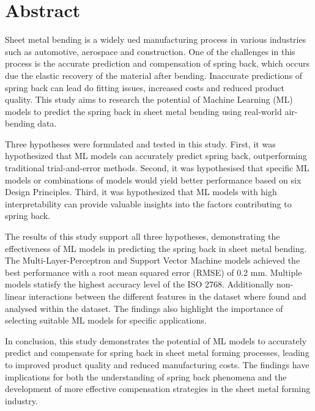 
\section*{Abstract}
\noindent Sheet metal bending is a widely ued manufacturing process in various industries such as automotive,
aerospace and construction.
One of the challenges in this process is the accurate prediction and compensation of spring back, which occurs
due the elastic recovery of the material after bending.
Inaccurate predictions of spring back can lead do fitting issues, increased costs and reduced product quality.
This study aims to research the potential of Machine Learning (ML) models to predict the spring back in sheet
metal bending using real-world air-bending data.

Three hypotheses were formulated and tested in this study.
First, it was hypothesized that ML models can accurately predict spring back, outperforming traditional trial-and-error methods.
Second, it was hypothesised that specific ML models or combinations of models would yield better performance
based on six Design Principles.
Third, it was hypothesized that ML models with high interpretability can provide valuable insights into the
factors contributing to spring back.

The results of this study support all three hypotheses, demonstrating the effectiveness of ML models in predicting the
spring back in sheet metal bending.
The Multi-Layer-Perceptron and Support Vector Machine models achieved the best performance with a root mean squared
error (RMSE) of 0.2 mm. Multiple models statisfy the highest accuracy level of the ISO 2768.
Additionally non-linear interactions between the different features in the dataset where found and analysed within
the dataset.
The findings also highlight the importance of selecting suitable ML models for specific applications.


In conclusion, this study demonstrates the potential of ML models to accurately predict and compensate for spring
back in sheet metal forming processes, leading to improved product quality and reduced manufacturing costs.
The findings have implications for both the understanding of spring back phenomena and the development of more
effective compensation strategies in the sheet metal forming industry.
